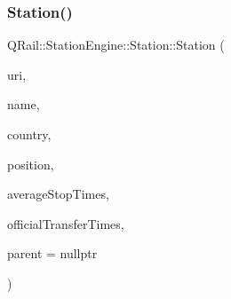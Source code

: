 \subsubsection{\texorpdfstring{Station()}{Station()}\hspace{0.1cm}{\footnotesize\ttfamily [2/5]}}
{\footnotesize\ttfamily Q\+Rail\+::\+Station\+Engine\+::\+Station\+::\+Station (\begin{DoxyParamCaption}\item[{const Q\+Url \&}]{uri,  }\item[{const Q\+Map$<$ Q\+Locale\+::\+Language, Q\+String $>$ \&}]{name,  }\item[{const Q\+Locale\+::\+Country \&}]{country,  }\item[{const Q\+Geo\+Coordinate \&}]{position,  }\item[{const qreal \&}]{average\+Stop\+Times,  }\item[{const quint32 \&}]{official\+Transfer\+Times,  }\item[{Q\+Object $\ast$}]{parent = {\ttfamily nullptr} }\end{DoxyParamCaption})\hspace{0.3cm}{\ttfamily [explicit]}}

\mbox{\label{classQRail_1_1StationEngine_1_1Station_af2600da9e72d362f459b71d00e6b144c}} 
